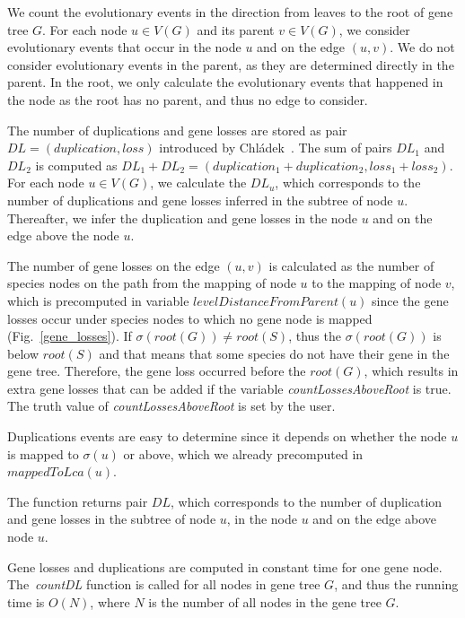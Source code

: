 We count the evolutionary events in the direction from leaves to the root of gene tree $G$. For each node $u \in V(G)$ and its parent $v \in V(G)$, we consider evolutionary events that occur in the node $u$ and on the edge $(u, v)$. We do not consider evolutionary events in the parent, as they are determined directly in the parent. In the root, we only calculate the evolutionary events that happened in the node as the root has no parent, and thus no edge to consider.

The number of duplications and gene losses are stored as pair $DL = (duplication, loss)$ introduced by Chládek~\cite{chladek_thesis}. The sum of pairs $DL_1$ and $DL_2$ is computed as $DL_1+DL_2=(duplication_1+duplication_2, loss_1+loss_2)$. For each node $u \in V(G)$, we calculate the $DL_u$, which corresponds to the number of duplications and gene losses inferred in the subtree of node $u$. Thereafter, we infer the duplication and gene losses in the node $u$ and on the edge above the node $u$.

The number of gene losses on the edge $(u, v)$ is calculated as the number of species nodes on the path from the mapping of node $u$ to the mapping of node $v$, which is precomputed in variable $levelDistanceFromParent(u)$ since the gene losses occur under species nodes to which no gene node is mapped (Fig.~\ref{gene_losses}). If $\sigma(root(G)) \ne root(S)$, thus the $\sigma(root(G))$ is below $root(S)$ and that means that some species do not have their gene in the gene tree. Therefore, the gene loss occurred before the $root(G)$, which results in extra gene losses that can be added if the variable \emph{countLossesAboveRoot} is true. The truth value of \emph{countLossesAboveRoot} is set by the user.

Duplications events are easy to determine since it depends on whether the node $u$ is mapped to $\sigma(u)$ or above, which we already precomputed in $mappedToLca(u)$.

The function returns pair $DL$, which corresponds to the number of duplication and gene losses in the subtree of node $u$, in the node $u$ and on the edge above node $u$.

Gene losses and duplications are computed in constant time for one gene node. The~\emph{countDL} function is called for all nodes in gene tree $G$, and thus the running time is $O(N)$, where $N$ is the number of all nodes in the gene tree $G$.

